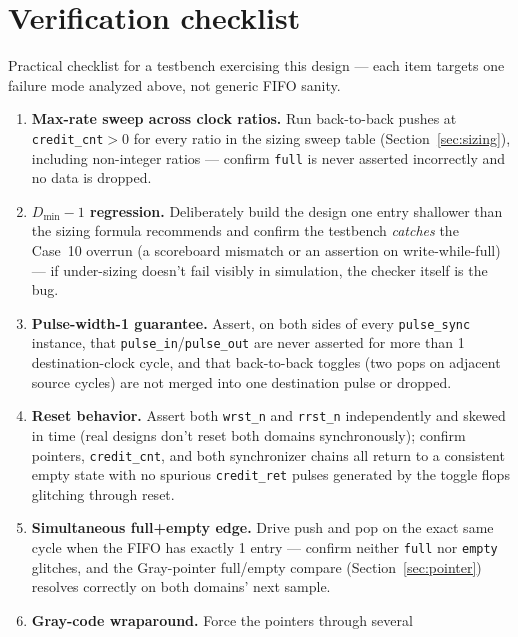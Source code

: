 \documentclass[12pt]{article}
\begin{document}
\clearpage
\section{Verification checklist}
\label{sec:verify}

Practical checklist for a testbench exercising this design — each item
targets one failure mode analyzed above, not generic FIFO sanity.

\begin{enumerate}[leftmargin=1.4em]
  \item \textbf{Max-rate sweep across clock ratios.} Run back-to-back
  pushes at \texttt{credit\_cnt}$>0$ for every ratio in the sizing sweep
  table (Section~\ref{sec:sizing}), including non-integer ratios — confirm
  \texttt{full} is never asserted incorrectly and no data is dropped.
  \item \textbf{$D_{\min}-1$ regression.} Deliberately build the design one
  entry shallower than the sizing formula recommends and confirm the
  testbench \emph{catches} the Case~10 overrun (a scoreboard mismatch or an
  assertion on write-while-full) — if under-sizing doesn't fail visibly in
  simulation, the checker itself is the bug.
  \item \textbf{Pulse-width-1 guarantee.} Assert, on both sides of every
  \texttt{pulse\_sync} instance, that \texttt{pulse\_in}/\texttt{pulse\_out}
  are never asserted for more than 1 destination-clock cycle, and that
  back-to-back toggles (two pops on adjacent source cycles) are not merged
  into one destination pulse or dropped.
  \item \textbf{Reset behavior.} Assert both \texttt{wrst\_n} and
  \texttt{rrst\_n} independently and skewed in time (real designs don't
  reset both domains synchronously); confirm pointers, \texttt{credit\_cnt},
  and both synchronizer chains all return to a consistent empty state with
  no spurious \texttt{credit\_ret} pulses generated by the toggle flops
  glitching through reset.
  \item \textbf{Simultaneous full+empty edge.} Drive push and pop on the
  exact same cycle when the FIFO has exactly 1 entry — confirm neither
  \texttt{full} nor \texttt{empty} glitches, and the Gray-pointer
  full/empty compare (Section~\ref{sec:pointer}) resolves correctly on both
  domains' next sample.
  \item \textbf{Gray-code wraparound.} Force the pointers through several

\end{enumerate}
\end{document}
